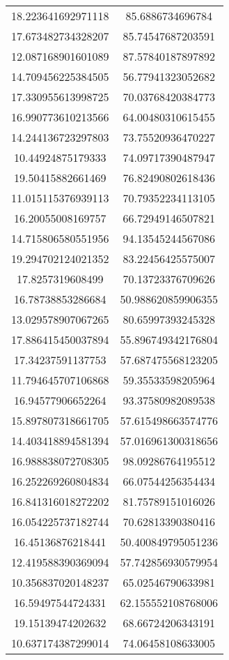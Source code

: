 \begin{table}
\begin{tabular}{cc}
18.223641692971118 & 85.6886734696784 \\
17.673482734328207 & 85.74547687203591 \\
12.087168901601089 & 87.57840187897892 \\
14.709456225384505 & 56.77941323052682 \\
17.330955613998725 & 70.03768420384773 \\
16.990773610213566 & 64.00480310615455 \\
14.244136723297803 & 73.75520936470227 \\
10.44924875179333 & 74.09717390487947 \\
19.50415882661469 & 76.82490802618436 \\
11.015115376939113 & 70.79352234113105 \\
16.20055008169757 & 66.72949146507821 \\
14.715806580551956 & 94.13545244567086 \\
19.294702124021352 & 83.22456425575007 \\
17.8257319608499 & 70.13723376709626 \\
16.78738853286684 & 50.988620859906355 \\
13.029578907067265 & 80.65997393245328 \\
17.886415450037894 & 55.896749342176804 \\
17.34237591137753 & 57.687475568123205 \\
11.794645707106868 & 59.35533598205964 \\
16.94577906652264 & 93.37580982089538 \\
15.897807318661705 & 57.615498663574776 \\
14.403418894581394 & 57.016961300318656 \\
16.988838072708305 & 98.09286764195512 \\
16.252269260804834 & 66.07544256354434 \\
16.841316018272202 & 81.75789151016026 \\
16.054225737182744 & 70.62813390380416 \\
16.45136876218441 & 50.400849795051236 \\
12.419588390369094 & 57.742856930579954 \\
10.356837020148237 & 65.02546790633981 \\
16.59497544724331 & 62.155552108768006 \\
19.15139474202632 & 68.66724206343191 \\
10.637174387299014 & 74.06458108633005 \\

\end{tabular}
\end{table}
